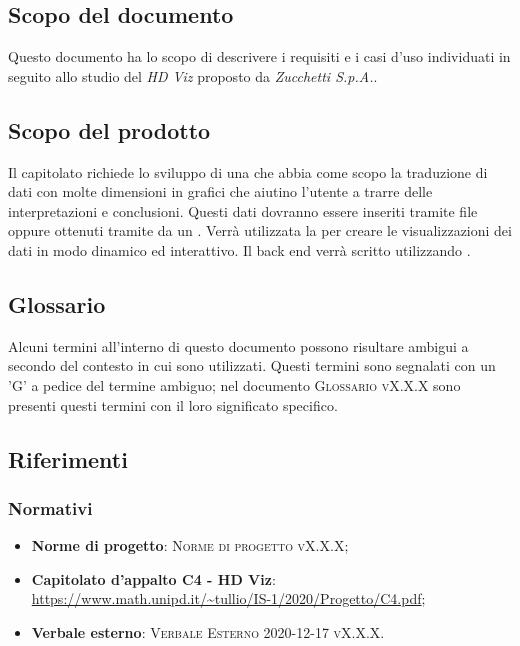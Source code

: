 \documentclass[../analisi-dei-requisiti.tex]{subfiles}
\begin{document}
\subsection{Scopo del documento}%
\label{subs:scopo_del_documento}
Questo documento ha lo scopo di descrivere i requisiti e i casi d'uso individuati in seguito allo studio del  \emph{HD Viz} proposto da \emph{Zucchetti S.p.A.}. 

\subsection{Scopo del prodotto}%
\label{subs:scopo_del_prodotto}
Il capitolato richiede lo sviluppo di una  che abbia come scopo la 
traduzione di dati con molte dimensioni in grafici che aiutino l’utente a trarre delle interpretazioni e conclusioni. Questi dati dovranno essere inseriti tramite file  oppure ottenuti tramite  da un .
Verrà utilizzata la    per creare le visualizzazioni dei dati in modo dinamico ed interattivo.
Il back end verrà scritto utilizzando . 


\subsection{Glossario}
\label{subs:glossario}
Alcuni termini all'interno di questo documento possono risultare ambigui a secondo del contesto in cui sono utilizzati.
Questi termini sono segnalati con un 'G' a pedice del termine ambiguo; nel documento \textsc{Glossario vX.X.X} sono presenti questi termini con il loro significato specifico.


\subsection{Riferimenti}
\label{subs:riferimenti}

\subsubsection{Normativi}%
\label{sssec:normativi}

\begin{itemize}
  \item \textbf{Norme di progetto}: \textsc{Norme di progetto vX.X.X};
  \item \textbf{Capitolato d'appalto C4 - HD Viz}: \url{https://www.math.unipd.it/~tullio/IS-1/2020/Progetto/C4.pdf};
  \item \textbf{Verbale esterno}: \textsc{Verbale Esterno 2020-12-17 vX.X.X}.
\end{itemize}
\end{document}
